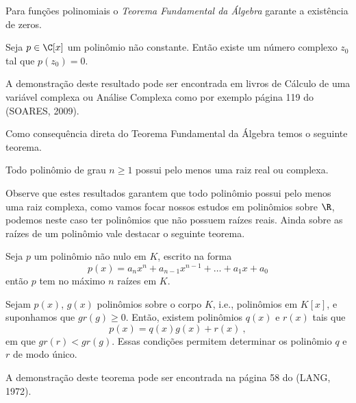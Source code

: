   Para funções polinomiais o \emph{Teorema Fundamental da Álgebra} garante a existência de zeros.

  \begin{teo}
  Seja $p \in \C[x]$ um polinômio não constante. Então existe um número complexo $z_0$ tal que $p(z_0)=0$.
  \end{teo}

  \begin{dem}
  A demonstração deste resultado pode ser encontrada em livros de Cálculo de uma variável complexa ou Análise Complexa como por exemplo página 119 do (SOARES, 2009).
  \end{dem}

  Como consequência direta do Teorema Fundamental da Álgebra temos o seguinte teorema.

  \begin{teo}
  Todo polinômio de grau $n \geq 1$ possui pelo menos uma raiz real ou complexa.
  \end{teo}

 Observe que estes resultados garantem que todo polinômio possui pelo menos uma raiz complexa, como vamos focar nossos estudos em polinômios sobre $\R$, podemos neste caso ter polinômios que não possuem raízes reais. Ainda sobre as raízes de um polinômio vale destacar o seguinte teorema.

 \begin{teo}
  Seja $p$ um polinômio não nulo em $K$, escrito na forma
\begin{equation}
p(x)= a_nx^n + a_{n-1}x^{n-1}+ \ldots + a_1x+ a_0
\end{equation}
   então $p$ tem no máximo $n$ raízes em $K$.
 \end{teo}

 \begin{teo}
  Sejam $p(x)$, $g(x)$ polinômios sobre o corpo $K$, i.e., polinômios em $K[x]$, e suponhamos que $gr(g) \geq 0$. Então, existem polinômios $q(x)$ e $r(x)$ tais que
\begin{equation}
p(x)= q(x)g(x) + r(x) \ , 
\end{equation}
  em que $gr(r) < gr (g)$. Essas condições permitem determinar os polinômio $q$ e $r$ de modo único.
 \end{teo}

 \begin{dem}
 A demonstração deste teorema pode ser encontrada na página 58 do (LANG, 1972).
 \end{dem}



